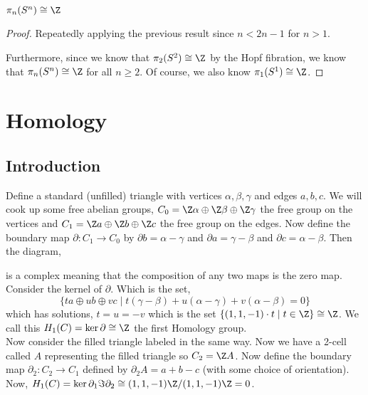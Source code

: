 \documentclass[12pt]{extarticle}
\begin{document}
\begin{corollary}
$\pi_n(S^n) \cong \Z$
\end{corollary}
\begin{proof}
Repeatedly applying the previous result since $n < 2n - 1$ for $n > 1$. 
\begin{center}
\end{center}
Furthermore, since we know that $\pi_2(S^2) \cong \Z$ by the Hopf fibration, we know that $\pi_n(S^n) \cong \Z$ for all $n \ge 2$. Of course, we also know $\pi_1(S^1) \cong \Z$. 
\end{proof}

\section{Homology}


\subsection{Introduction}

Define a standard (unfilled) triangle with vertices $\alpha, \beta, \gamma$ and edges $a,b,c$. We will cook up some free abelian groups, $C_0 = \Z \alpha \oplus \Z \beta \oplus \Z \gamma$ the free group on the vertices and $C_1 = \Z a \oplus \Z b \oplus \Z c$ the free group on the edges. Now define the boundary map $\partial : C_1 \to C_0$ by $\partial b = \alpha - \gamma$ and $\partial a = \gamma - \beta$ and $\partial c = \alpha - \beta$. Then the diagram,
\begin{center}
\end{center}
is a complex meaning that the composition of any two maps is the zero map. Consider the kernel of $\partial$. Which is the set,
\[ \{ t a \oplus ub \oplus vc  \mid t(\gamma - \beta) + u(\alpha - \gamma) + v(\alpha - \beta) = 0 \} \]
which has solutions, $t = u = - v$ which is the set $\{ (1, 1, -1) \cdot t \mid t \in \Z\} \cong \Z$. We call this $H_1(C) = \ker{\partial} \cong \Z$ the first Homology group. \bigskip\\
Now consider the filled triangle labeled in the same way. Now we have a 2-cell called $A$ representing the filled triangle so $C_2 = \Z A$. Now define the boundary map $\partial_2 : C_2 \to C_1$ defined by $\partial_2 A = a + b - c$ (with some choice of orientation). Now, $H_1(C) = \ker{\partial_1}{\Im{\partial_2}} \cong (1, 1, -1) \Z / (1,1,-1)\Z = 0$.   
\end{document}
